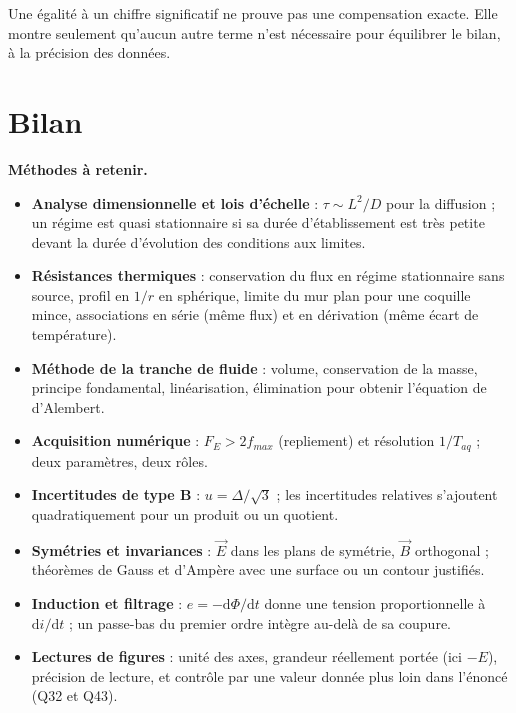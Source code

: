 \documentclass[11pt,a4paper]{article}
\providecommand{\tightlist}{\setlength{\itemsep}{0pt}\setlength{\parskip}{0pt}}
\begin{document}
\begin{piege}

Une égalité à un chiffre significatif ne prouve pas une compensation exacte. Elle montre seulement qu'aucun autre terme n'est nécessaire pour équilibrer le bilan, à la précision des données.

\end{piege}

\hypertarget{bilan}{%
\section{Bilan}\label{bilan}}

\textbf{Méthodes à retenir.}

\begin{itemize}
\tightlist
\item
  \textbf{Analyse dimensionnelle et lois d'échelle} : \(\tau\sim L^2/D\) pour la diffusion ; un régime est quasi stationnaire si sa durée d'établissement est très petite devant la durée d'évolution des conditions aux limites.
\item
  \textbf{Résistances thermiques} : conservation du flux en régime stationnaire sans source, profil en \(1/r\) en sphérique, limite du mur plan pour une coquille mince, associations en série (même flux) et en dérivation (même écart de température).
\item
  \textbf{Méthode de la tranche de fluide} : volume, conservation de la masse, principe fondamental, linéarisation, élimination pour obtenir l'équation de d'Alembert.
\item
  \textbf{Acquisition numérique} : \(F_E>2f_{max}\) (repliement) et résolution \(1/T_{aq}\) ; deux paramètres, deux rôles.
\item
  \textbf{Incertitudes de type B} : \(u=\Delta/\sqrt3\) ; les incertitudes relatives s'ajoutent quadratiquement pour un produit ou un quotient.
\item
  \textbf{Symétries et invariances} : \(\vec E\) dans les plans de symétrie, \(\vec B\) orthogonal ; théorèmes de Gauss et d'Ampère avec une surface ou un contour justifiés.
\item
  \textbf{Induction et filtrage} : \(e=-\mathrm d\Phi/\mathrm dt\) donne une tension proportionnelle à \(\mathrm di/\mathrm dt\) ; un passe-bas du premier ordre intègre au-delà de sa coupure.
\item
  \textbf{Lectures de figures} : unité des axes, grandeur réellement portée (ici \(-E\)), précision de lecture, et contrôle par une valeur donnée plus loin dans l'énoncé (Q32 et Q43).
\end{itemize}
\end{document}
